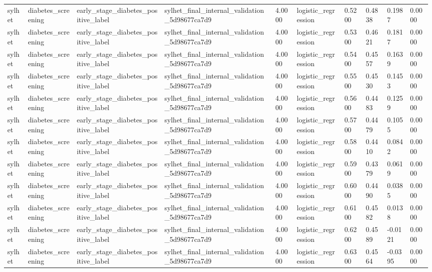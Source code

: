 \begin{tabular}{llllllllll}
sylhet & diabetes\_screening & early\_stage\_diabetes\_positive\_label & sylhet\_final\_internal\_validation\_5d98677ca7d9 & 4.0000 & logistic\_regression & 0.5200 & 0.4838 & 0.1987 & 0.0000 \\
sylhet & diabetes\_screening & early\_stage\_diabetes\_positive\_label & sylhet\_final\_internal\_validation\_5d98677ca7d9 & 4.0000 & logistic\_regression & 0.5300 & 0.4621 & 0.1817 & 0.0000 \\
sylhet & diabetes\_screening & early\_stage\_diabetes\_positive\_label & sylhet\_final\_internal\_validation\_5d98677ca7d9 & 4.0000 & logistic\_regression & 0.5400 & 0.4557 & 0.1639 & 0.0000 \\
sylhet & diabetes\_screening & early\_stage\_diabetes\_positive\_label & sylhet\_final\_internal\_validation\_5d98677ca7d9 & 4.0000 & logistic\_regression & 0.5500 & 0.4530 & 0.1453 & 0.0000 \\
sylhet & diabetes\_screening & early\_stage\_diabetes\_positive\_label & sylhet\_final\_internal\_validation\_5d98677ca7d9 & 4.0000 & logistic\_regression & 0.5600 & 0.4483 & 0.1259 & 0.0000 \\
sylhet & diabetes\_screening & early\_stage\_diabetes\_positive\_label & sylhet\_final\_internal\_validation\_5d98677ca7d9 & 4.0000 & logistic\_regression & 0.5700 & 0.4479 & 0.1055 & 0.0000 \\
sylhet & diabetes\_screening & early\_stage\_diabetes\_positive\_label & sylhet\_final\_internal\_validation\_5d98677ca7d9 & 4.0000 & logistic\_regression & 0.5800 & 0.4410 & 0.0842 & 0.0000 \\
sylhet & diabetes\_screening & early\_stage\_diabetes\_positive\_label & sylhet\_final\_internal\_validation\_5d98677ca7d9 & 4.0000 & logistic\_regression & 0.5900 & 0.4379 & 0.0619 & 0.0000 \\
sylhet & diabetes\_screening & early\_stage\_diabetes\_positive\_label & sylhet\_final\_internal\_validation\_5d98677ca7d9 & 4.0000 & logistic\_regression & 0.6000 & 0.4490 & 0.0385 & 0.0000 \\
sylhet & diabetes\_screening & early\_stage\_diabetes\_positive\_label & sylhet\_final\_internal\_validation\_5d98677ca7d9 & 4.0000 & logistic\_regression & 0.6100 & 0.4582 & 0.0138 & 0.0000 \\
sylhet & diabetes\_screening & early\_stage\_diabetes\_positive\_label & sylhet\_final\_internal\_validation\_5d98677ca7d9 & 4.0000 & logistic\_regression & 0.6200 & 0.4589 & -0.0121 & 0.0000 \\
sylhet & diabetes\_screening & early\_stage\_diabetes\_positive\_label & sylhet\_final\_internal\_validation\_5d98677ca7d9 & 4.0000 & logistic\_regression & 0.6300 & 0.4564 & -0.0395 & 0.0000 \\

\end{tabular}
